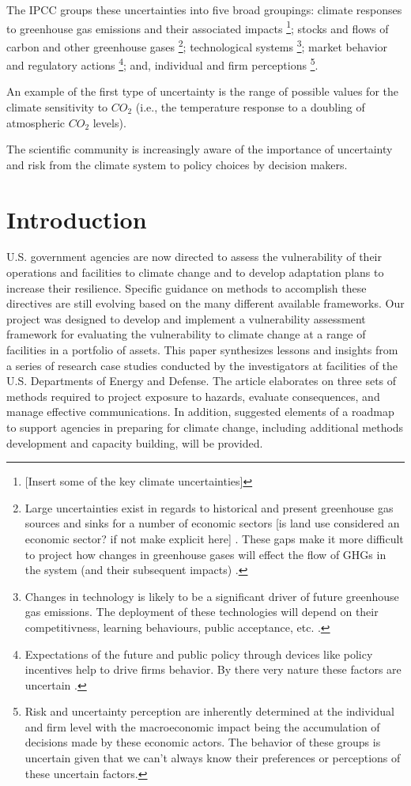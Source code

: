 \documentclass[10pt]{amsart}
\begin{document}
The IPCC groups these uncertainties into five broad groupings: climate responses to greenhouse gas emissions and their associated impacts \footnote{[Insert some of the key climate uncertainties]}; stocks and flows of carbon and other greenhouse gases \footnote{Large uncertainties exist in regards to historical and present greenhouse gas sources and sinks for a number of economic sectors [is land use considered an economic sector? if not make explicit here] \parencite{kunreuther2014integrated}. These gaps make it more difficult to project how changes in greenhouse gases will effect the flow of GHGs in the system (and their subsequent impacts) \parencite{kunreuther2014integrated}.}; technological systems \footnote{Changes in technology is likely to be a significant driver of future greenhouse gas emissions. The deployment of these technologies will depend on their competitivness, learning behaviours, public acceptance, etc. \parencite{kunreuther2014integrated}.}; market behavior and regulatory actions \footnote{Expectations of the future and public policy through devices like policy incentives help to drive firms behavior. By there very nature these factors are uncertain \parencite{kunreuther2014integrated}.}; and, individual and firm perceptions \parencite{kunreuther2014integrated}\footnote{Risk and uncertainty perception are inherently determined at the individual and firm level with the macroeconomic impact being the accumulation of decisions made by these economic actors. The behavior of these groups is uncertain given that we can't always know their preferences or perceptions of these uncertain factors.}.


An example of the first type of uncertainty is the range of possible values for the climate sensitivity to $CO_2$ (i.e., the temperature response to a doubling of atmospheric $CO_2$ levels). 

The scientific community is increasingly aware of the importance of uncertainty and risk from the climate system to policy choices by decision makers.

\section{Introduction}
U.S. government agencies are now directed to assess the vulnerability of their operations and facilities to climate change and to develop adaptation plans to increase their resilience. 
Specific guidance on methods to accomplish these directives are still evolving based on the many different available frameworks. 
Our project was designed to develop and implement a vulnerability assessment framework for evaluating the vulnerability to climate change at a range of facilities in a portfolio of assets. 
This paper synthesizes lessons and insights from a series of research case studies conducted by the investigators at facilities of the U.S. Departments of Energy and Defense. 
The article elaborates on three sets of methods required to project exposure to hazards, evaluate consequences, and manage effective communications. 
In addition, suggested elements of a roadmap to support agencies in preparing for climate change, including additional methods development and capacity building, will be provided.
\end{document}
